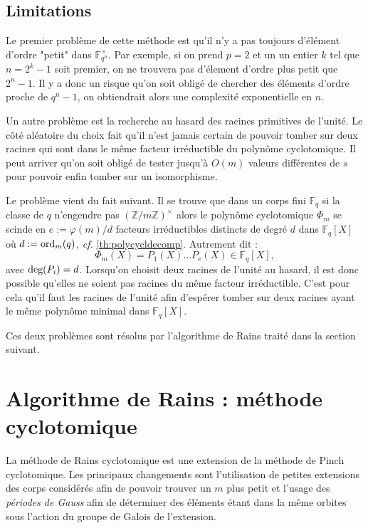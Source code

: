 \documentclass[a4paper]{article} %
\numberwithin{section}{part}
\numberwithin{equation}{section}
\newcommand\zmodninv[1]{(\mathbb{Z}/#1\mathbb{Z})^{\times}}
\newcommand\GF[1]{\mathbb{F}_{#1}}
\newcommand\ord[2]{\textup{ord}_{#1}(#2)}
\begin{document}
\subsection{Limitations}
Le premier problème de cette méthode est qu'il n'y a pas toujours d'élément
d'ordre "petit" dans $\GF{q^n}^{\times}$. Par exemple, si on prend $p = 2$ et un
un entier $k$ tel que $n = 2^k - 1$ soit premier, on ne trouvera pas d'élement 
d'ordre plus petit que $2^n - 1$. Il y a donc un risque qu'on soit obligé de 
chercher des éléments d'ordre proche de $q^n - 1$, on obtiendrait alors une 
complexité exponentielle en $n$.\par
Un autre problème est la recherche au hasard des racines primitives de l'unité. 
Le côté aléatoire du choix fait qu'il n'est jamais certain de pouvoir tomber sur
deux racines qui sont dans le même facteur irréductible du polynôme
cyclotomique. Il peut arriver qu'on soit obligé de tester jusqu'à $O(m)$ valeurs
différentes de $s$ pour pouvoir enfin tomber sur un isomorphisme.\par
Le problème vient du fait suivant. Il se trouve que dans un corps fini $\GF{q}$
si la classe de $q$ n'engendre pas $\zmodninv{m}$ alors le polynôme cyclotomique
$\Phi_m$ se scinde en $e := \varphi(m)/d$ facteurs irréductibles distincts de 
degré $d$ dans $\GF{q}[X]$ où $d := \ord{m}{q}$, \emph{cf.} 
\ref{th:polycycldecomp}. Autrement dit :
\begin{equation}
\Phi_m(X) = P_1(X)\dots P_e(X)\in\GF{q}[X],
\end{equation}
avec $\textup{deg}(P_i) = d$. Lorsqu'on choisit deux racines de l'unité au
hasard, il est donc possible qu'elles ne soient pas racines du même facteur
irréductible. C'est pour cela qu'il faut \fg{} les racines de
l'unité afin d'espérer tomber sur deux racines ayant le même polynôme minimal
dans $\GF{q}[X]$.\par
Ces deux problèmes sont résolus par l'algorithme de Rains traité dans la section
suivant.
\section{Algorithme de Rains : méthode cyclotomique}
La méthode de Rains cyclotomique est une extension de la méthode de Pinch
cyclotomique. Les principaux changements sont l'utilisation de petites
extensions des corps considérés afin de pouvoir trouver un $m$ plus petit et
l'usage des \emph{périodes de Gauss} afin de déterminer des éléments étant dans 
la même orbites sous l'action du groupe de Galois de l'extension.
\end{document}
